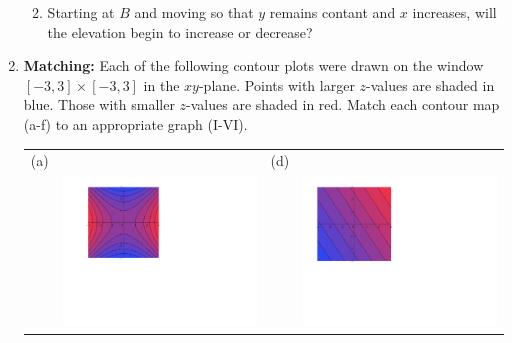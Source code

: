 \documentclass[12pt]{article}
\newif\ifans
\begin{document}
\begin{enumerate}
\begin{enumerate}
 \fi

\item Starting at $B$ and moving so that $y$ remains contant and $x$ increases, will the elevation begin to increase or decrease?

\ifans{\fbox{Decrease}}\fi

\end{enumerate}

\newpage

\item {\bf Matching:} Each of the following contour plots were drawn on the window $[-3,3]\times[-3,3]$ in the $xy$-plane.  Points with larger $z$-values are shaded in blue.  Those with smaller $z$-values are shaded in red.  Match each contour map (a-f) to an appropriate graph (I-VI).

\begin{center}
\begin{tabular}{lc|cc}
(a)&&(d)\\
&\includegraphics[scale=0.52]{matching1.pdf} &\hspace{0.5 cm}& \includegraphics[scale=0.5]{matching4.pdf}\\

\end{tabular}
\end{center}
\end{enumerate}
\end{document}
